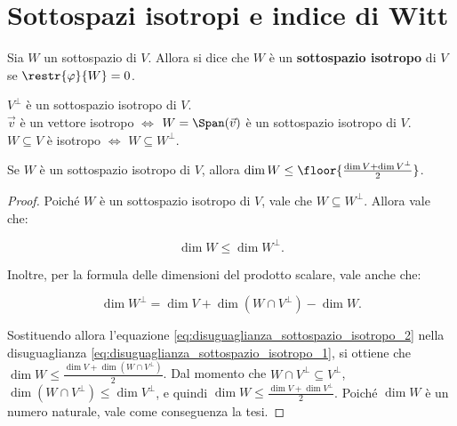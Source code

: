 \section{Sottospazi isotropi e indice di Witt}

\begin{definition}
	Sia $W$ un sottospazio di $V$. Allora si dice che $W$ è un \textbf{sottospazio isotropo} di $V$
	se $\restr{\varphi}{W} = 0$.
\end{definition}

\begin{remark}\nl
	\li $V^\perp$ è un sottospazio isotropo di $V$. \\
	\li $\vec{v}$ è un vettore isotropo $\iff$ $W = \Span(\vec v)$ è un sottospazio isotropo di $V$. \\
	\li $W \subseteq V$ è isotropo $\iff$ $W \subseteq W^\perp$.
\end{remark}

\begin{proposition} \label{prop:disuguaglianza_sottospazio_isotropo}
	Se $W$ è un sottospazio isotropo di $V$, allora
	$\dim W \leq \floor{\frac{\dim V + \dim V^\perp}{2}}$.
\end{proposition}

\begin{proof}
	Poiché $W$ è un sottospazio isotropo di $V$, vale che $W \subseteq W^\perp$. Allora vale che:
	
	\begin{equation} \label{eq:disuguaglianza_sottospazio_isotropo_1}
		\dim W \leq \dim W^\perp.
	\end{equation}
	
	\vskip 0.05in

	Inoltre, per la formula delle dimensioni del prodotto scalare, vale anche che:
	
	\begin{equation} \label{eq:disuguaglianza_sottospazio_isotropo_2}
		\dim W^\perp = \dim V + \dim (W \cap V^\perp) - \dim W.
	\end{equation}
	
	\vskip 0.05in
	 
	 Sostituendo allora l'equazione \eqref{eq:disuguaglianza_sottospazio_isotropo_2} nella disuguaglianza
	 \eqref{eq:disuguaglianza_sottospazio_isotropo_1}, si ottiene che $\dim W \leq \frac{\dim V + \dim (W \cap V^\perp)}{2}$. Dal momento che $W \cap V^\perp \subseteq V^\perp$,
	 $\dim (W \cap V^\perp) \leq \dim V^\perp$, e quindi $\dim W \leq \frac{\dim V + \dim V^\perp}{2}$. Poiché $\dim W$ è un numero naturale, vale come conseguenza la tesi.
\end{proof}

